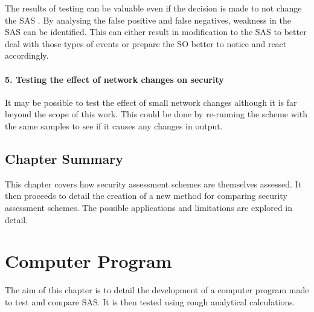 \documentclass[a4paper,oneside,12pt]{report}
\begin{document}
The results of testing can be valuable even if the decision is made to not change the SAS . By analysing the false positive and false negatives, weakness in the SAS can be identified. This can either result in modification to the SAS to better deal with those types of events or prepare the SO better to notice and react accordingly.

\subsubsection{5. Testing the effect of network changes on security}

It may be possible to test the effect of small network changes although it is far beyond the scope of this work. This could be done by re-running the scheme with the same samples to see if it causes any changes in output.


\section{Chapter Summary}

This chapter covers how security assessment schemes are themselves assessed. It then proceeds to detail the creation of a new method for comparing security assessment schemes. The possible applications and limitations are explored in detail.

























\chapter{Computer Program}

The aim of this chapter is to detail the development of a computer program made to test and compare SAS. It is then tested using rough analytical calculations.
\end{document}

